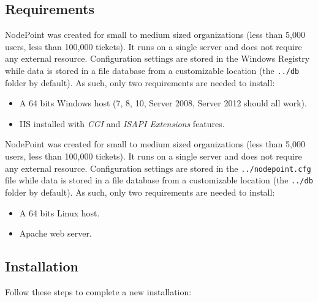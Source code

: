 \documentclass[11pt]{article}
\begin{document}
\clearpage
\subsection{Requirements}
{
NodePoint was created for small to medium sized organizations (less than 5,000 users, less than 100,000 tickets). It runs on a single server and does not require any external resource. Configuration settings are stored in the Windows Registry while data is stored in a file database from a customizable location (the \texttt{../db} folder by default). As such, only two requirements are needed to install:
\begin{itemize}
\item A 64 bits Windows host (7, 8, 10, Server 2008, Server 2012 should all work).
\item IIS installed with \textit{CGI} and \textit{ISAPI Extensions} features.
\end{itemize}
}
{
NodePoint was created for small to medium sized organizations (less than 5,000 users, less than 100,000 tickets). It runs on a single server and does not require any external resource. Configuration settings are stored in the \texttt{../nodepoint.cfg} file while data is stored in a file database from a customizable location (the \texttt{../db} folder by default). As such, only two requirements are needed to install:
\begin{itemize}
\item A 64 bits Linux host.
\item Apache web server.
\end{itemize}
}

\subsection{Installation}
Follow these steps to complete a new installation:
\end{document}

